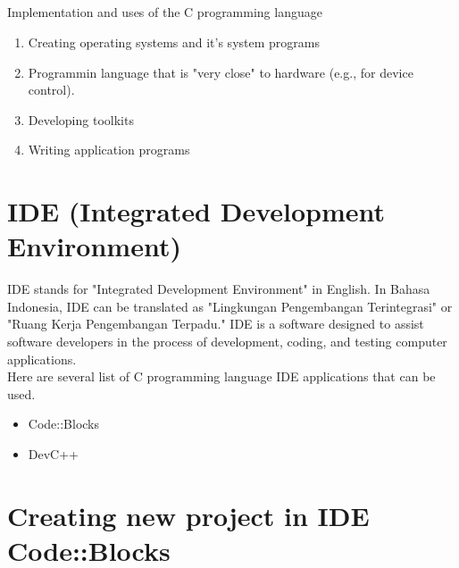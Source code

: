 \subsection*{}Implementation and uses of the C programming language
\begin{enumerate}
	\item Creating operating systems and it's system programs
	\item Programmin language that is "very close" to hardware (e.g., for device control).
	\item Developing toolkits
	\item Writing application programs
\end{enumerate}
\section{IDE (Integrated Development Environment)}
IDE stands for "Integrated Development Environment" in English. In Bahasa Indonesia, IDE can be translated as "Lingkungan Pengembangan Terintegrasi" or "Ruang Kerja Pengembangan Terpadu." IDE is a software designed to assist software developers in the process of development, coding, and testing computer applications.
\\
Here are several list of C programming language IDE applications that can be used.
\begin{itemize}
	\item Code::Blocks
	\item DevC++
\end{itemize}
\section{Creating new project in IDE Code::Blocks}
